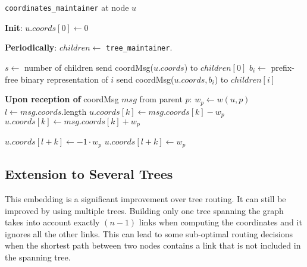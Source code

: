 \documentclass[conference]{IEEEtran}
\begin{document}
\begin{algorithm}
\caption{\texttt{coordinates\_maintainer} at node $u$}
\begin{algorithmic}
\begin{small}
\State \textbf{Init}:
	\State $u.coords[0] \leftarrow 0$ \vspace{0.06in}

\State \textbf{Periodically}:
	\State $children \leftarrow$ \texttt{tree\_maintainer}.
		\State {}
	\EndIf

\vspace{0.06in}

	\State $s \leftarrow$ number of children
		\State send coordMsg($u.coords$) to $children[0]$
	\EndIf
			\State $b_i \leftarrow$ prefix-free binary representation of $i$
\State send coordMsg($u.coords, b_i$) to $children[i]$
		\EndFor
	\EndIf
\EndProcedure

\vspace{0.06in}

\State \textbf{Upon reception of} coordMsg $msg$ from parent $p$:
	\State $w_p \leftarrow w(u,p)$ 
	\State $l \leftarrow msg.coords$.length
			\State $u.coords[k] \leftarrow msg.coords[k] - w_p$
		\Else
			\State $u.coords[k] \leftarrow msg.coords[k] + w_p$
		\EndIf
	\EndFor

			\State $u.coords[l+k] \leftarrow -1 \cdot w_p$
		\EndIf
			\State $u.coords[l+k] \leftarrow w_p$
		\EndIf
	\EndFor
		\State {}
	\EndIf
\end{small}
\end{algorithmic}
\label{alg:coordMaint}

\end{algorithm}

\subsection{Extension to Several Trees}
\label{sec:multipleTrees}
This embedding is a significant improvement over tree routing. It can still be improved by using multiple trees. Building only one tree spanning the graph takes into account exactly $(n-1)$ links when computing the coordinates and it ignores all the other links.  This can lead to some sub-optimal routing decisions when the shortest path between two nodes contains a link that is not included in the spanning tree.
\end{document}
